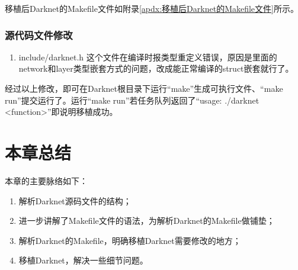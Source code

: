 移植后Darknet的Makefile文件如附录\ref{apdx:移植后Darknet的Makefile文件}所示。

\subsubsection{源代码文件修改}
\begin{enumerate}
	\item include/darknet.h
	      这个文件在编译时报类型重定义错误，原因是里面的network和layer类型嵌套方式的问题，改成能正常编译的struct嵌套就行了。
\end{enumerate}

经过以上修改，即可在Darknet根目录下运行“make”生成可执行文件、“make run”提交运行了。运行“make run”若任务队列返回了“usage: ./darknet <function>”即说明移植成功。

\section{本章总结}
本章的主要脉络如下：
\begin{enumerate}
	\item 解析Darknet源码文件的结构；
	\item 进一步讲解了Makefile文件的语法，为解析Darknet的Makefile做铺垫；
	\item 解析Darknet的Makefile，明确移植Darknet需要修改的地方；
	\item 移植Darknet，解决一些细节问题。
\end{enumerate}
